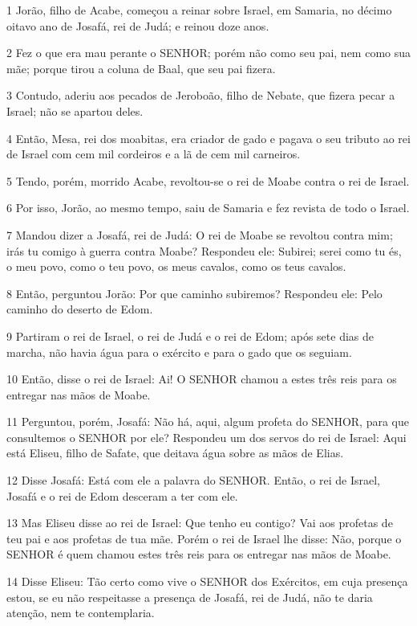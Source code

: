 \par 1 Jorão, filho de Acabe, começou a reinar sobre Israel, em Samaria, no décimo oitavo ano de Josafá, rei de Judá; e reinou doze anos.
\par 2 Fez o que era mau perante o SENHOR; porém não como seu pai, nem como sua mãe; porque tirou a coluna de Baal, que seu pai fizera.
\par 3 Contudo, aderiu aos pecados de Jeroboão, filho de Nebate, que fizera pecar a Israel; não se apartou deles.
\par 4 Então, Mesa, rei dos moabitas, era criador de gado e pagava o seu tributo ao rei de Israel com cem mil cordeiros e a lã de cem mil carneiros.
\par 5 Tendo, porém, morrido Acabe, revoltou-se o rei de Moabe contra o rei de Israel.
\par 6 Por isso, Jorão, ao mesmo tempo, saiu de Samaria e fez revista de todo o Israel.
\par 7 Mandou dizer a Josafá, rei de Judá: O rei de Moabe se revoltou contra mim; irás tu comigo à guerra contra Moabe? Respondeu ele: Subirei; serei como tu és, o meu povo, como o teu povo, os meus cavalos, como os teus cavalos.
\par 8 Então, perguntou Jorão: Por que caminho subiremos? Respondeu ele: Pelo caminho do deserto de Edom.
\par 9 Partiram o rei de Israel, o rei de Judá e o rei de Edom; após sete dias de marcha, não havia água para o exército e para o gado que os seguiam.
\par 10 Então, disse o rei de Israel: Ai! O SENHOR chamou a estes três reis para os entregar nas mãos de Moabe.
\par 11 Perguntou, porém, Josafá: Não há, aqui, algum profeta do SENHOR, para que consultemos o SENHOR por ele? Respondeu um dos servos do rei de Israel: Aqui está Eliseu, filho de Safate, que deitava água sobre as mãos de Elias.
\par 12 Disse Josafá: Está com ele a palavra do SENHOR. Então, o rei de Israel, Josafá e o rei de Edom desceram a ter com ele.
\par 13 Mas Eliseu disse ao rei de Israel: Que tenho eu contigo? Vai aos profetas de teu pai e aos profetas de tua mãe. Porém o rei de Israel lhe disse: Não, porque o SENHOR é quem chamou estes três reis para os entregar nas mãos de Moabe.
\par 14 Disse Eliseu: Tão certo como vive o SENHOR dos Exércitos, em cuja presença estou, se eu não respeitasse a presença de Josafá, rei de Judá, não te daria atenção, nem te contemplaria.
